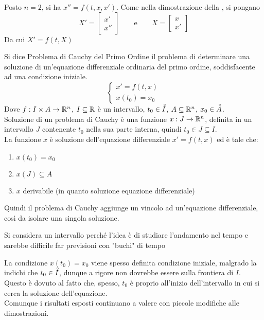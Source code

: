 \begin{example}
	Posto $n=2$, si ha $x''=f(t, x, x')$.
	Come nella dimostrazione della , si pongano
	\[X'= \begin{bmatrix} x'\\ x'' \end{bmatrix} \qquad \text{e} \qquad X=\begin{bmatrix}x\\ x'\end{bmatrix}\]
	Da cui $X'=f(t,X)$
\end{example}

\begin{definition}
	\label{def:prob_cauchy_ord_1}
	Si dice Problema di Cauchy del Primo Ordine il problema di determinare una soluzione di un'equazione differenziale ordinaria del primo ordine, soddisfacente ad una condizione iniziale.
	\[\begin{cases}x'=f(t,x)\\x(t_0)=x_0\end{cases}\]
	Dove $f:I\times A\to \mathbb{R}^n$, $I\subseteq \mathbb{R}$ è un intervallo, $t_0\in\accentset{\circ}{I}$, $A\subseteq \mathbb{R}^n$, $x_0\in\accentset{\circ}{A}$.\\
	Soluzione di un problema di Cauchy è una funzione $x:J\to \mathbb{R}^n$, definita in un intervallo $J$ contenente $t_0$ nella sua parte interna, quindi $t_0\in J\subseteq I$.\\
	La funzione $x$ è soluzione dell'equazione differenziale $x'=f(t,x)$ ed è tale che:
	\begin{enumerate}
		\item $x(t_0)=x_0$
		\item $x(J)\subseteq A$
		\item $x$ derivabile (in quanto soluzione equazione differenziale)
	\end{enumerate}
	Quindi il problema di Cauchy aggiunge un vincolo ad un'equazione differenziale, così da isolare una singola soluzione.
\end{definition}
\begin{note}
	Si considera un intervallo perché l'idea è di studiare l'andamento nel tempo e sarebbe difficile far previsioni con "buchi" di tempo
\end{note}
\begin{note}
	La condizione $x(t_0) = x_0$ viene spesso definita condizione iniziale, malgrado la  indichi che $t_0 \in \accentset{\circ}{I}$, dunque a rigore non dovrebbe essere sulla frontiera di $I$. Questo è dovuto al fatto che, spesso, $t_0$ è proprio all'inizio dell'intervallo in cui si cerca la soluzione dell'equazione.\\
	Comunque i risultati esposti continuano a valere con piccole modifiche alle dimostrazioni.
\end{note}

